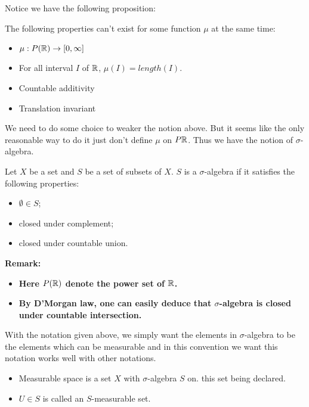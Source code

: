 \documentclass[11pt]{article}
\begin{document}
Notice we have the following proposition:

\begin{proposition}
The following properties can't exist for some function \(\mu\) at the same time:
\begin{itemize}
\item \(\mu:P(\mathbb{R}) \to [0,\infty]\)
\item For all interval \(I\) of \(\mathbb{R}\), \(\mu(I) = length(I)\).
\item Countable additivity
\item Translation invariant
\end{itemize}
\end{proposition}

We need to do some choice to weaker the notion above. But it seems like the only reasonable way to do it just don't define \(\mu\) on \(P\mathbb{R}\). Thus we have the notion of \(\sigma\)-algebra.

\begin{definition}
Let \(X\) be a set and \(S\) be a set of subsets of \(X\). \(S\) is a \(\sigma\)-algebra if it satisfies the following properties:
\begin{itemize}
\item \(\emptyset \in S\);
\item closed under complement;
\item closed under countable union.
\end{itemize}
\end{definition}


\textbf{Remark:}
\begin{itemize}
\item \textbf{Here \(P(\mathbb{R})\) denote the power set of \(\mathbb{R}\).}
\item \textbf{By D'Morgan law, one can easily deduce that \(\sigma\)-algebra is closed under countable intersection.}
\end{itemize}


With the notation given above, we simply want the elements in \(\sigma\)-algebra to be the elements which can be measurable and in this convention we want this notation works well with other notations.

\begin{definition}
\begin{itemize}
\item Measurable space is a set \(X\) with \(\sigma\)-algebra \(S\) on. this set being declared.
\item \(U \in S\) is called an \(S\)-measurable set.
\end{itemize}
\end{definition}
\end{document}

